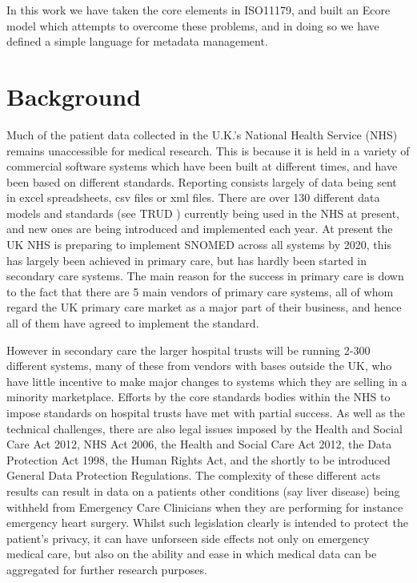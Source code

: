 \documentclass{llncs}
\begin{document}
In this work we have taken the core elements in ISO11179, and built an Ecore model which attempts to overcome these problems, and in doing so we have defined a simple language for metadata management.


\section{Background}

Much of the patient data collected in the U.K.'s National Health Service (NHS) remains unaccessible for medical research. This is because it is held in a variety of commercial software systems which have been built at different times, and have been based on different standards. Reporting consists largely of data being sent in excel spreadsheets, csv files or xml files.  There are over 130 different data models and standards (see TRUD \cite{TRUD}) currently being used in the NHS at present, and new ones are being introduced and implemented each year. At present the UK NHS is preparing to implement SNOMED across all systems by 2020, this has largely been achieved in primary care, but has hardly been started in secondary care systems. The main reason for the success in primary care is down to the fact that there are 5 main vendors of primary care systems, all of whom regard the UK primary care market as a major part of their business, and hence all of them have agreed to implement the standard.  

However in secondary care the larger hospital trusts will be running 2-300 different systems, many of these from vendors with bases outside the UK, who have little incentive to make major changes to systems which they are selling in a minority marketplace. Efforts by the core standards bodies within the NHS to impose standards on hospital trusts have met with partial success. As well as the technical challenges, there are also legal issues imposed by the Health and Social Care Act 2012, NHS Act 2006, the Health and Social Care Act 2012, the Data Protection Act 1998, the Human Rights Act, and the shortly to be introduced General Data Protection Regulations.  The complexity of these different acts results can result in data on a patients other conditions (say liver disease) being withheld from Emergency Care Clinicians when they are performing for instance emergency heart surgery. Whilst such legislation clearly is intended to protect the patient's privacy, it can have unforseen side effects not only on emergency medical care, but also on the ability and ease in which medical data can be aggregated for further research purposes.
\end{document}
